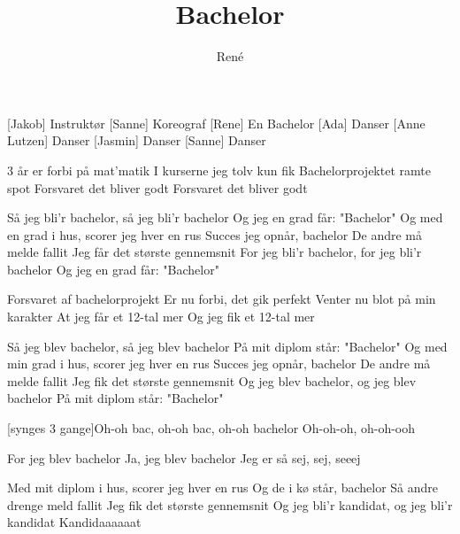 \documentclass[a4paper,11pt]{article}
\title{Bachelor}
\author{René}
\begin{document}
\maketitle

\begin{roles}
[Jakob] Instruktør
[Sanne] Koreograf 
[Rene] En Bachelor
[Ada] Danser
[Anne Lutzen] Danser
[Jasmin] Danser
[Sanne] Danser
\end{roles}

\begin{song}
 3 år er forbi på mat'matik
I kurserne jeg tolv kun fik
Bachelorprojektet ramte spot
Forsvaret det bliver godt
Forsvaret det bliver godt

Så jeg bli'r bachelor, så jeg bli'r bachelor
Og jeg en grad får: "Bachelor"
Og med en grad i hus, scorer jeg hver en rus
Succes jeg opnår, bachelor
De andre må melde fallit
Jeg får det største gennemsnit
For jeg bli'r bachelor, for jeg bli'r bachelor
Og jeg en grad får:
"Bachelor"

Forsvaret af bachelorprojekt
Er nu forbi, det gik perfekt
Venter nu blot på min karakter
At jeg får et 12-tal mer
Og jeg fik et 12-tal mer

Så jeg blev bachelor, så jeg blev bachelor
På mit diplom står: "Bachelor"
Og med min grad i hus, scorer jeg hver en rus
Succes jeg opnår, bachelor
De andre må melde fallit
Jeg fik det største gennemsnit
Og jeg blev bachelor, og jeg blev bachelor
På mit diplom står: 
"Bachelor"

[synges 3 gange]Oh-oh bac, oh-oh bac, oh-oh bachelor 
Oh-oh-oh, oh-oh-ooh 

For jeg blev bachelor
Ja,  jeg blev bachelor
Jeg er så sej, sej, seeej

Med mit diplom i hus, scorer jeg hver en rus
Og de i kø står, bachelor
Så andre drenge meld fallit
Jeg fik det største gennemsnit
Og jeg bli'r kandidat, og jeg bli'r kandidat
Kandidaaaaaat

\end{song}
\end{document}

